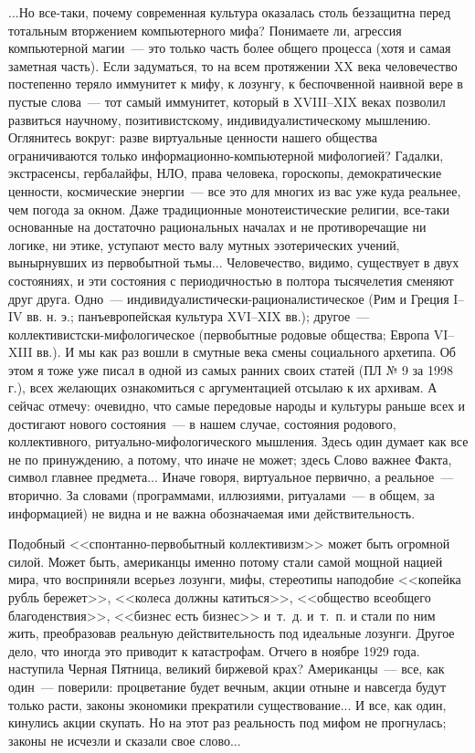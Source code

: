 \documentclass{scrbook}
\newcommand{\flqq}{<<}
\newcommand{\frqq}{>>}
\newcommand{\mdash}{~--- }
\newcommand{\ndash}{--}
\begin{document}
...Но все-таки, почему современная культура оказалась столь беззащитна перед тотальным вторжением компьютерного мифа? Понимаете ли, агрессия компьютерной магии{\mdash}это только часть более общего процесса (хотя и самая заметная часть). Если задуматься, то на всем протяжении XX века человечество постепенно теряло иммунитет к мифу, к лозунгу, к беспочвенной наивной вере в пустые слова{\mdash}тот самый иммунитет, который в XVIII{\ndash}XIX веках позволил развиться научному, позитивистскому, индивидуалистическому мышлению. Оглянитесь вокруг: разве виртуальные ценности нашего общества ограничиваются только информационно-компьютерной мифологией? Гадалки, экстрасенсы, гербалайфы, НЛО, права человека, гороскопы, демократические ценности, космические энергии{\mdash}все это для многих из вас уже куда реальнее, чем погода за окном. Даже традиционные монотеистические религии, все-таки основанные на достаточно рациональных началах и не противоречащие ни логике, ни этике, уступают место валу мутных эзотерических учений, вынырнувших из первобытной тьмы... Человечество, видимо, существует в двух состояниях, и эти состояния с периодичностью в полтора тысячелетия сменяют друг друга. Одно{\mdash}индивидуалистически-рационалистическое (Рим и Греция I{\ndash}IV вв. н. э.; панъевропейская культура XVI{\ndash}XIX вв.); другое{\mdash}коллективистски-мифологическое (первобытные родовые общества; Европа VI{\ndash}XIII вв.). И мы как раз вошли в смутные века смены социального архетипа. Об этом я тоже уже писал в одной из самых ранних своих статей (ПЛ № 9 за 1998 г.), всех желающих ознакомиться с аргументацией отсылаю к их архивам. А сейчас отмечу: очевидно, что самые передовые народы и культуры раньше всех и достигают нового состояния{\mdash}в нашем случае, состояния родового, коллективного, ритуально-мифологического мышления. Здесь один думает как все не по принуждению, а потому, что иначе не может; здесь Слово важнее Факта, символ главнее предмета... Иначе говоря, виртуальное первично, а реальное{\mdash}вторично. За словами (программами, иллюзиями, ритуалами{\mdash}в общем, за информацией) не видна и не важна обозначаемая ими действительность.

Подобный {\flqq}спонтанно-первобытный коллективизм{\frqq} может быть огромной силой. Может быть, американцы именно потому стали самой мощной нацией мира, что восприняли всерьез лозунги, мифы, стереотипы наподобие {\flqq}копейка рубль бережет{\frqq}, {\flqq}колеса должны катиться{\frqq}, {\flqq}общество всеобщего благоденствия{\frqq}, {\flqq}бизнес есть бизнес{\frqq} и~т.~д. и~т.~п. и стали по ним жить, преобразовав реальную действительность под идеальные лозунги. Другое дело, что иногда это приводит к катастрофам. Отчего в ноябре 1929 года. наступила Черная Пятница, великий биржевой крах? Американцы{\mdash}все, как один{\mdash}поверили: процветание будет вечным, акции отныне и навсегда будут только расти, законы экономики прекратили существование... И все, как один, кинулись акции скупать. Но на этот раз реальность под мифом не прогнулась; законы не исчезли и сказали свое слово...
\end{document}
